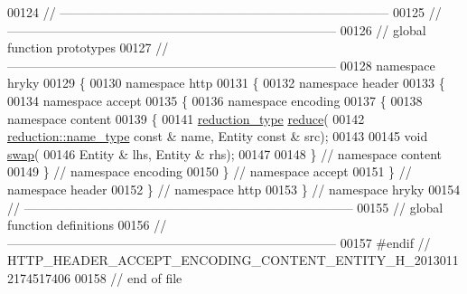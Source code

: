 \begin{DoxyCode}
00124 \textcolor{comment}{//
      ------------------------------------------------------------------------------}
00125 \textcolor{comment}{//
      ------------------------------------------------------------------------------}
00126 \textcolor{comment}{// global function prototypes}
00127 \textcolor{comment}{//
      ------------------------------------------------------------------------------}
00128 \textcolor{keyword}{namespace }hryky
00129 \{
00130 \textcolor{keyword}{namespace }http
00131 \{
00132 \textcolor{keyword}{namespace }header
00133 \{
00134 \textcolor{keyword}{namespace }accept
00135 \{
00136 \textcolor{keyword}{namespace }encoding
00137 \{
00138 \textcolor{keyword}{namespace }content
00139 \{
00141     \hyperlink{namespacehryky_a343a9a4c36a586be5c2693156200eadc}{reduction_type} \hyperlink{namespacehryky_1_1http_a08fc36a78a8e2908140fcd102829a566}{reduce}(
00142         \hyperlink{namespacehryky_1_1reduction_ac686c30a4c8d196bbd0f05629a6b921f}{reduction::name_type} \textcolor{keyword}{const} & name, Entity \textcolor{keyword}{const} & src);
00143 
00145     \textcolor{keywordtype}{void} \hyperlink{namespacehryky_1_1http_a38e62595ad532d18fbc65ceb61973aec}{swap}(
00146         Entity & lhs, Entity & rhs);
00147 
00148 \} \textcolor{comment}{// namespace content}
00149 \} \textcolor{comment}{// namespace encoding}
00150 \} \textcolor{comment}{// namespace accept}
00151 \} \textcolor{comment}{// namespace header}
00152 \} \textcolor{comment}{// namespace http}
00153 \} \textcolor{comment}{// namespace hryky}
00154 \textcolor{comment}{//
      ------------------------------------------------------------------------------}
00155 \textcolor{comment}{// global function definitions}
00156 \textcolor{comment}{//
      ------------------------------------------------------------------------------}
00157 \textcolor{preprocessor}{#endif // HTTP\_HEADER\_ACCEPT\_ENCODING\_CONTENT\_ENTITY\_H\_20130112174517406}
00158 \textcolor{preprocessor}{}\textcolor{comment}{// end of file}
\end{DoxyCode}

